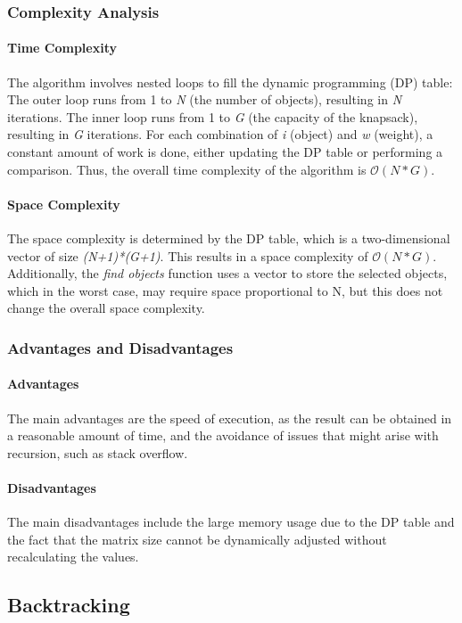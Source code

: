 \documentclass{llncs}
\begin{document}
\subsubsection{Complexity Analysis}
\paragraph{Time Complexity}
The algorithm involves nested loops to fill the dynamic programming (DP) table:
The outer loop runs from 1 to \textit{N} (the number of objects), resulting in \textit{N} iterations.
The inner loop runs from 1 to \textit{G} (the capacity of the knapsack), resulting in \textit{G} 
iterations. For each combination of \textit{i} (object) and \textit{w} (weight), a constant amount
of work is done, either updating the DP table or performing a comparison. Thus, the overall time
complexity of the algorithm is $\mathcal{O}(N*G)$.

\paragraph{Space Complexity}
The space complexity is determined by the DP table, which is a two-dimensional vector of size 
\textit{(N+1)*(G+1)}. This results in a space complexity of $\mathcal{O}(N*G)$.
Additionally, the \textit{find objects} function uses a vector to store the selected objects, which 
in the worst case, may require space proportional to N, but this does not change the overall space 
complexity.

\subsubsection{Advantages and Disadvantages}
\paragraph{Advantages}
The main advantages are the speed of execution, as the result can be obtained in a reasonable amount
of time, and the avoidance of issues that might arise with recursion, such as stack overflow.

\paragraph{Disadvantages}
The main disadvantages include the large memory usage due to the DP table and the fact that the 
matrix size cannot be dynamically adjusted without recalculating the values.

\subsection{Backtracking}
\end{document}
